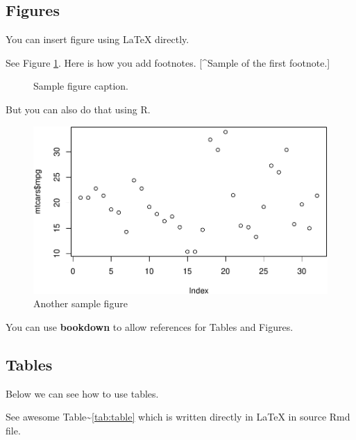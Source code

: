 \documentclass{article}
\newenvironment{Shaded}{\begin{snugshade}}{\end{snugshade}}
\newcommand{\FunctionTok}[1]{\textcolor[rgb]{0.00,0.00,0.00}{#1}}
\newcommand{\NormalTok}[1]{#1}
\newcommand{\SpecialCharTok}[1]{\textcolor[rgb]{0.00,0.00,0.00}{#1}}
\begin{document}
\hypertarget{figures}{%
\subsection{Figures}\label{figures}}

You can insert figure using LaTeX directly.

See Figure \ref{fig:fig1}. Here is how you add footnotes. {[}\^{}Sample
of the first footnote.{]}

\begin{figure}
  \centering
  \fbox{\rule[-.5cm]{4cm}{4cm} \rule[-.5cm]{4cm}{0cm}}
  \caption{Sample figure caption.}
  \label{fig:fig1}
\end{figure}

But you can also do that using R.

\begin{Shaded}
\end{Shaded}

\begin{figure}
\centering
\includegraphics{report_files/figure-latex/fig2-1.pdf}
\caption{Another sample figure}
\end{figure}

You can use \textbf{bookdown} to allow references for Tables and
Figures.

\hypertarget{tables}{%
\subsection{Tables}\label{tables}}

Below we can see how to use tables.

See awesome Table\textasciitilde{}\ref{tab:table} which is written
directly in LaTeX in source Rmd file.
\end{document}

